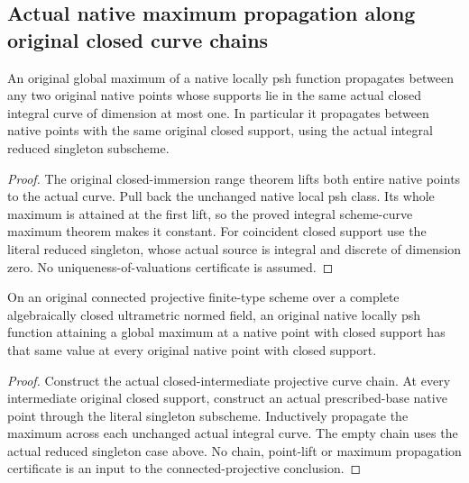 \subsection{Actual native maximum propagation along original closed curve chains}

\begin{theorem}
\label{thm:fc-native-maximum-integral-closed-curve}
\leanok
An original global maximum of a native locally psh function propagates between
any two original native points whose supports lie in the same actual closed
integral curve of dimension at most one. In particular it propagates between
native points with the same original closed support, using the actual integral
reduced singleton subscheme.
\end{theorem}
\begin{proof}
The original closed-immersion range theorem lifts both entire native points
to the actual curve. Pull back the unchanged native local psh class. Its whole
maximum is attained at the first lift, so the proved integral scheme-curve
maximum theorem makes it constant. For coincident closed support use the
literal reduced singleton, whose actual source is integral and discrete of
dimension zero. No uniqueness-of-valuations certificate is assumed.
\end{proof}

\begin{theorem}
\label{thm:fc-native-maximum-closed-projective-chain}
\leanok
On an original connected projective finite-type scheme over a complete
algebraically closed ultrametric normed field, an original native locally psh
function attaining a global maximum at a native point with closed support has
that same value at every original native point with closed support.
\end{theorem}
\begin{proof}
Construct the actual closed-intermediate projective curve chain. At every
intermediate original closed support, construct an actual prescribed-base
native point through the literal singleton subscheme. Inductively propagate
the maximum across each unchanged actual integral curve. The empty chain uses
the actual reduced singleton case above. No chain, point-lift or maximum
propagation certificate is an input to the connected-projective conclusion.
\end{proof}
